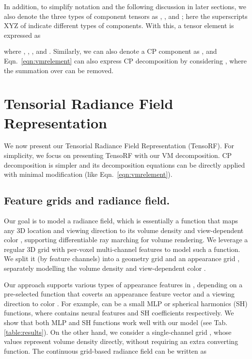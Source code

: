 \documentclass[runningheads]{llncs}
\begin{document}
In addition, to simplify notation and the following discussion in later sections, we also denote the three types of component tensors as , , and ; here the superscripts XYZ of  indicate different types of components.
With this, a tensor element  is expressed as

where , , , and . Similarly, we can also denote a CP component as , and Eqn.~\ref{eqn:vmrelement} can also express CP decomposition by considering , where the summation over  can be removed.
 









\section{Tensorial Radiance Field Representation}
\label{sec:tensorf}
We now present our Tensorial Radiance Field Representation (TensoRF). For simplicity, we focus on presenting TensoRF with our VM decomposition. CP decomposition is simpler and its decomposition equations can be directly applied with minimal modification (like Eqn.~\ref{eqn:vmrelement}).

\subsection{Feature grids and radiance field.}
\label{sec:grids}
Our goal is to model a radiance field, which is essentially a function that maps any 3D location  and viewing direction  to its volume density  and view-dependent color , supporting differentiable ray marching for volume rendering.
We leverage a regular 3D grid  with per-voxel multi-channel features to model such a function. We split it (by feature channels) into a geometry grid  and an appearance grid , separately modelling the volume density  and view-dependent color .

Our approach supports various types of appearance features in , depending on a pre-selected function  that coverts an appearance feature vector and a viewing direction  to color . For example,  can be a small MLP or spherical harmonics (SH) functions, where  contains neural features and SH coefficients respectively.
We show that both MLP and SH functions work well with our model (see Tab.\ref{table:results}).
On the other hand, we consider a single-channel grid , whose values represent volume density directly, without requiring an extra converting function. The continuous grid-based radiance field can be written as
\end{document}
